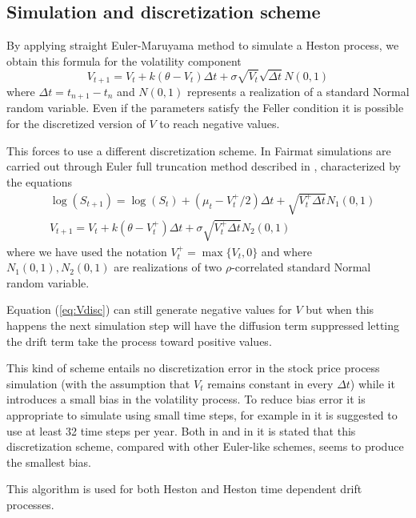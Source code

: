 \subsection{Simulation and discretization scheme}

By applying straight Euler-Maruyama method to simulate a Heston process, we obtain this formula for the volatility component
\begin{equation}
V_{t+1} = V_t + k(\theta - V_t)\Delta t + \sigma\sqrt{V_t}\sqrt{\Delta t} N(0,1)
\end{equation}
where $\Delta t = t_{n+1}-t_n$ and $N(0,1)$ represents a realization of a standard Normal random variable. Even if the parameters satisfy the Feller condition it is possible for the discretized version of $V$ to reach negative values.

This forces to use a different discretization scheme. In Fairmat simulations are carried out through Euler full truncation method described in \cite{HaastrechtPelsser:EffHestonSim}, characterized by the equations
\begin{align}
&\log(S_{t+1}) = \log(S_t) + \left(\mu_t - V_t^+/2\right)\Delta t + \sqrt{V_t^+\Delta t} N_1(0,1)\\
&V_{t+1} = V_t + k\left(\theta - V_t^+\right)\Delta t + \sigma\sqrt{V_t^+\Delta t} N_2(0,1)\label{eq:Vdisc}
\end{align}
where we have used the notation $V_t^+=\max\{V_t,0\}$ and where $N_1(0,1), N_2(0,1)$ are realizations of two $\rho$-correlated standard Normal random variable.

Equation (\ref{eq:Vdisc}) can still generate negative values for $V$ but when this happens the next simulation step will have the diffusion term suppressed letting the drift term take the process toward positive values.

This kind of scheme entails no discretization error in the stock price process simulation (with the assumption that $V_t$ remains constant in every $\Delta t$) while it introduces a small bias in the volatility process. To reduce bias error it is appropriate to simulate using small time steps, for example in \cite{HaastrechtPelsser:EffHestonSim} it is suggested to use at least 32 time steps per year. Both in \cite{HaastrechtPelsser:EffHestonSim} and in \cite{Lord:CompBiasSimSchemes} it is stated that this discretization scheme, compared with other Euler-like schemes, seems to produce the smallest bias.

This algorithm is used for both Heston and Heston time dependent drift processes.


